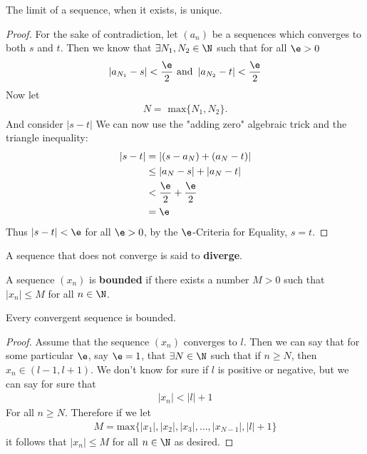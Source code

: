 \begin{theorem}
	The limit of a sequence, when it exists, is unique.
\end{theorem}

\begin{proof}
	For the sake of contradiction, let $\left( a_n \right) $ be a sequences which converges to both $s$ and $t$. Then we know that $\exists N_1, N_2 \in \N$ such that for all $\e > 0$ 
	\begin{align}
		\left|a_{N_{1}} - s\right| < \frac{\e}{2} \text{   and   } \left|a_{N_{2}} - t\right| < \frac{\e}{2}
	\end{align}
	Now let 
	\begin{align}
		N = \text{ max}\{N_{1}, N_{2}\}.
	\end{align}
	And consider $\left|s - t\right|$ We can now use the "adding zero" algebraic trick and the triangle inequality:
	\begin{align}
		\left|s - t\right| &= \left|\left( s - a_N \right) + \left( a_N - t \right) \right| \\
				   &\le  \left|a_N - s\right| + \left|a_N - t\right| \\
				   &< \frac{\e}{2} + \frac{\e}{2} \\
				   &= \e
	\end{align}
	Thus $\left|s - t\right| < \e$ for all $\e > 0$, by the $\e$-Criteria for Equality, $s=t$.
\end{proof}

\begin{definition}
	A sequence that does not converge is said to  \textbf{diverge}.
\end{definition}

\begin{definition}
	A sequence $\left( x_n \right) $ is \textbf{bounded} if there exists a number $M > 0$ such that $\left|x_n\right| \le M$ for all $n \in \N$.
\end{definition}

\begin{theorem}
	Every convergent sequence is bounded.
\end{theorem}

\begin{proof}
	Assume that the sequence $\left( x_n \right) $ converges to $l$. Then we can say that for some particular $\e$, say $\e = 1$, that $\exists N \in  \N$ such that if $n \ge N$, then $x_n \in \left( l - 1, l + 1 \right) $. We don't know for sure if $l$ is positive or negative, but we can say for sure that
	\begin{align}
		\left|x_n\right| < \left|l\right| + 1 		
	\end{align}
	For all $n \ge N$. Therefore if we let 
	\begin{align}
		M = \text{max}\{\left|x_1\right|, \left|x_2\right|, \left|x_3\right|, \ldots, \left|x_{N-1}\right|, \left|l\right| + 1\} 
	\end{align}
	it follows that $\left|x_n\right| \le M$ for all $n \in \N$ as desired. 
\end{proof}

